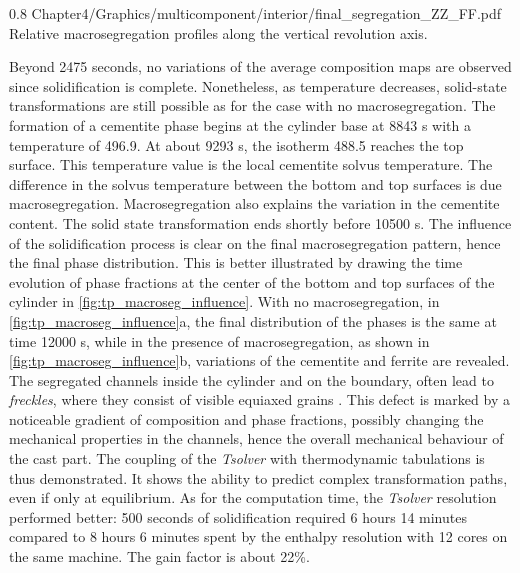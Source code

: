 \begin{figureth}
{0.8}
{Chapter4/Graphics/multicomponent/interior/final_segregation_ZZ_FF.pdf}
{Relative macrosegregation profiles along the vertical revolution axis.}
\label{fig:segregation_profile_ZZ}
\end{figureth}

Beyond \num{2475} seconds, no variations of the average composition maps are observed since solidification is complete. 
Nonetheless, as temperature decreases, solid-state transformations are 
still possible as for the case with no macrosegregation. The formation of a cementite phase begins at the 
cylinder base at \num{8843} s with a temperature of \SI{496.9}{\udegC}. At about \num{9293} s, the isotherm \SI{488.5}{\udegC} reaches the 
top surface. This temperature value is the local cementite solvus temperature. The difference in the solvus 
temperature between the bottom and top surfaces is due macrosegregation. Macrosegregation also explains the 
variation in the cementite content. The solid state transformation ends shortly before \num{10500} s. The influence of the solidification process is clear on 
the final macrosegregation pattern, hence the final phase distribution. This is better illustrated by drawing the time evolution of phase fractions at the 
center of the bottom and top surfaces of the cylinder in \cref{fig:tp_macroseg_influence}. With no macrosegregation, in 
\cref{fig:tp_macroseg_influence}a, the final distribution of the phases is the same at time \num{12000} s, while in
the presence of macrosegregation, 
as shown in \cref{fig:tp_macroseg_influence}b, variations of the cementite and ferrite are revealed. 
The segregated channels inside the cylinder and on the boundary, often lead to \emph{freckles}, 
where they consist of visible equiaxed grains \citep{copley_origin_1970}.
This defect is marked by a noticeable gradient of composition and phase fractions, possibly changing the mechanical 
properties in the channels, hence the overall mechanical behaviour of the cast part. The coupling of the \emph{Tsolver} with 
thermodynamic tabulations is thus demonstrated. It shows the ability to predict complex transformation paths, even if 
only at equilibrium. As for the computation time, the \emph{Tsolver} resolution performed better: 500 seconds of solidification 
required 6 hours 14 minutes compared to 8 hours 6 minutes spent by the enthalpy resolution with 12 cores on the same machine. 
The gain factor is about 22\%.

